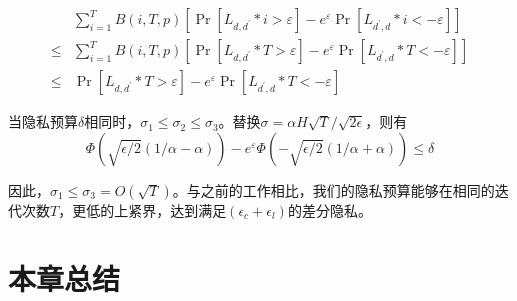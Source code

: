 \begin{equation}\label{eq:隐私预算计算3}
\begin{aligned}
& \sum_{i=1}^{T} B(i, T, p)\left[\operatorname{Pr}\left[L_{d, d^{\prime}} * i>\varepsilon\right]-e^{\varepsilon} \operatorname{Pr}\left[L_{d^{\prime}, d} * i<-\varepsilon\right]\right] \\
\leq & \sum_{i=1}^{T} B(i, T, p)\left[\operatorname{Pr}\left[L_{d, d^{\prime}} * T>\varepsilon\right]-e^{\varepsilon} \operatorname{Pr}\left[L_{d^{\prime}, d} * T<-\varepsilon\right]\right] \\
\leq & \operatorname{Pr}\left[L_{d, d^{\prime}} * T>\varepsilon\right]-e^{\varepsilon} \operatorname{Pr}\left[L_{d^{\prime}, d} * T<-\varepsilon\right]
\end{aligned}
\end{equation}

当隐私预算$\delta$相同时，$\sigma_{1} \leq \sigma_{2} \leq \sigma_{3}$。替换$\sigma=\alpha H \sqrt{T} / \sqrt{2 \epsilon}$，则有
\begin{equation}\label{eq:隐私预算计算4}
\Phi(\sqrt{\epsilon / 2}(1 / \alpha-\alpha))-e^{\varepsilon} \Phi(-\sqrt{\epsilon / 2}(1 / \alpha+\alpha)) \leq \delta
\end{equation}

因此，$\sigma_{1} \leq \sigma_{3}=O(\sqrt{T})$。与之前的工作相比，我们的隐私预算能够在相同的迭代次数$T$，更低的上紧界，达到满足$\left(\epsilon_{c}+\epsilon_{l}\right)$的差分隐私。


\section{本章总结}


